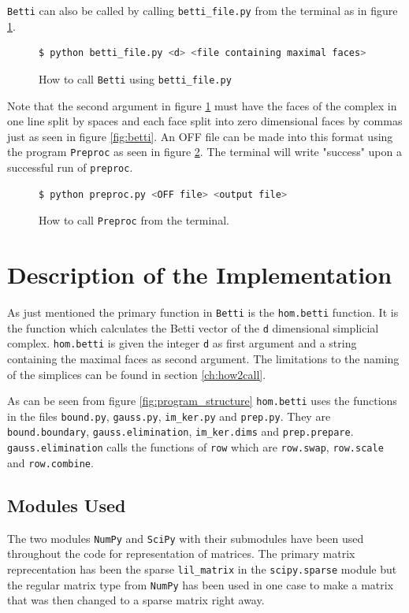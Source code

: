 \documentclass[11pt,a4paper,twoside]{report}
\begin{document}
\texttt{Betti} can also be called by calling \texttt{betti\_file.py} from the terminal as in figure \ref{fig:bettifile}.
\begin{figure}[H]
\begin{lstlisting}[language=bash]
$ python betti_file.py <d> <file containing maximal faces> 
\end{lstlisting}
\caption{How to call \texttt{Betti} using \texttt{betti\_file.py}}
\label{fig:bettifile}
\end{figure}
Note that the second argument in figure \ref{fig:bettifile} must have the faces of the complex in one line split by spaces and each face split into zero dimensional faces by commas just as seen in figure \ref{fig:betti}. An OFF file can be made into this format using the program \texttt{Preproc} as seen in figure \ref{fig:preproc}. The terminal will write "success" upon a successful run of \texttt{preproc}.

\begin{figure}[H]
\begin{lstlisting}[language=bash]
$ python preproc.py <OFF file> <output file> 
\end{lstlisting}
\caption{How to call \texttt{Preproc} from the terminal.}
\label{fig:preproc}
\end{figure}

\section{Description of the Implementation}
As just mentioned the primary function in \texttt{Betti} is the \texttt{hom.betti} function. It is the function which calculates the Betti vector of the \texttt{d} dimensional simplicial complex. \texttt{hom.betti} is given the integer \texttt{d} as first argument and a string containing the maximal faces as second argument. The limitations to the naming of the simplices can be found in section \ref{ch:how2call}. 

As can be seen from figure \ref{fig:program_structure} \texttt{hom.betti} uses the functions in the files \texttt{bound.py}, \texttt{gauss.py}, \texttt{im\_ker.py} and \texttt{prep.py}. They are \texttt{bound.boundary}, \texttt{gauss.elimination}, \texttt{im\_ker.dims} and \texttt{prep.prepare}. \texttt{gauss.elimination} calls the functions of \texttt{row} which are \texttt{row.swap}, \texttt{row.scale} and \texttt{row.combine}.

\subsection{Modules Used}
The two modules \texttt{NumPy} and \texttt{SciPy} with their submodules have been used throughout the code for representation of matrices. The primary matrix reprecentation has been the sparse \texttt{lil\_matrix} in the \texttt{scipy.sparse} module but the regular matrix type from \texttt{NumPy} has been used in one case to make a matrix that was then changed to a sparse matrix right away. 
\end{document}
